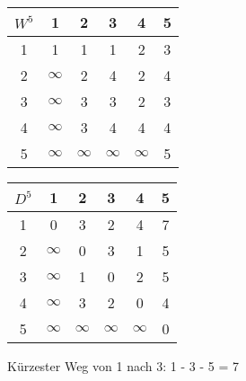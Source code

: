 \documentclass{article}
\begin{document}
	\begin{center}
		\begin{tabular}{c|ccccc}
			$W^5$ & 1 & 2 & 3 & 4 & 5 \\
			\hline
			1 & 1 & 1 & 1 & 2 & \cellcolor{blue!20}3 \\
			2 & $\infty$ & 2 & 4 & 2 & \cellcolor{blue!20}4 \\
			3 & $\infty$ & 3 & 3 & 2 & \cellcolor{blue!20}3 \\
			4 & $\infty$ & 3 & 4 & 4 & \cellcolor{blue!20}4 \\
			5 & \cellcolor{blue!20}$\infty$ & \cellcolor{blue!20}$\infty$ & \cellcolor{blue!20}$\infty$ & \cellcolor{blue!20}$\infty$ & \cellcolor{blue!20}5
		\end{tabular}
		\begin{tabular}{c|ccccc}
			$D^5$ & 1 & 2 & 3 & 4 & 5 \\
			\hline
			1 & 0 & 3 & 2 & 4 & \cellcolor{blue!20}7 \\
			2 & $\infty$ & 0 & 3 & 1 & \cellcolor{blue!20}5 \\
			3 & $\infty$ & 1 & 0 & 2 & \cellcolor{blue!20}5 \\
			4 & $\infty$ & 3 & 2 & 0 & \cellcolor{blue!20}4 \\
			5 & \cellcolor{blue!20}$\infty$ & \cellcolor{blue!20}$\infty$ & \cellcolor{blue!20}$\infty$ & \cellcolor{blue!20}$\infty$ & \cellcolor{blue!20}0
		\end{tabular}
	\end{center}
	Kürzester Weg von 1 nach 3: 1 - 3 - 5 = 7
\end{document}
